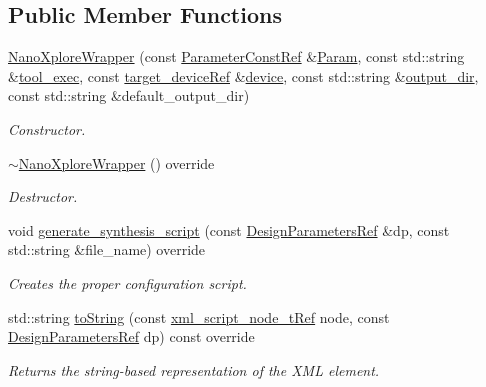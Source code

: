 \subsection*{Public Member Functions}
\begin{DoxyCompactItemize}
\item 
\hyperlink{classNanoXploreWrapper_a0304c7e4f176fa98ad82feca482bd500}{Nano\+Xplore\+Wrapper} (const \hyperlink{Parameter_8hpp_a37841774a6fcb479b597fdf8955eb4ea}{Parameter\+Const\+Ref} \&\hyperlink{classSynthesisTool_a854ef102782ff4d069e1aa6d1a94d64e}{Param}, const std\+::string \&\hyperlink{classSynthesisTool_a78fd58496215c69838de4269204804a5}{tool\+\_\+exec}, const \hyperlink{target__device_8hpp_acedb2b7a617e27e6354a8049fee44eda}{target\+\_\+device\+Ref} \&\hyperlink{classSynthesisTool_a07bf37421c6cff80ba70682ea2b2e3ae}{device}, const std\+::string \&\hyperlink{classSynthesisTool_a285793f6f539ed6f049c375cdb68d607}{output\+\_\+dir}, const std\+::string \&default\+\_\+output\+\_\+dir)
\begin{DoxyCompactList}\small\item\em Constructor. \end{DoxyCompactList}\item 
\hyperlink{classNanoXploreWrapper_a77516222ea5ee579e188457e26886a4e}{$\sim$\+Nano\+Xplore\+Wrapper} () override
\begin{DoxyCompactList}\small\item\em Destructor. \end{DoxyCompactList}\item 
void \hyperlink{classNanoXploreWrapper_ac4cfa67a4c97e96b14aca7dbbe39e79b}{generate\+\_\+synthesis\+\_\+script} (const \hyperlink{DesignParameters_8hpp_ae36bb1c4c9150d0eeecfe1f96f42d157}{Design\+Parameters\+Ref} \&dp, const std\+::string \&file\+\_\+name) override
\begin{DoxyCompactList}\small\item\em Creates the proper configuration script. \end{DoxyCompactList}\item 
std\+::string \hyperlink{classNanoXploreWrapper_ac21600c8f4e069a14f07a91560caf0c1}{to\+String} (const \hyperlink{xml__script__command_8hpp_a1fe3d50ade66bc35e41be9b68bbbcd02}{xml\+\_\+script\+\_\+node\+\_\+t\+Ref} node, const \hyperlink{DesignParameters_8hpp_ae36bb1c4c9150d0eeecfe1f96f42d157}{Design\+Parameters\+Ref} dp) const override
\begin{DoxyCompactList}\small\item\em Returns the string-\/based representation of the X\+ML element. \end{DoxyCompactList}\item 

\end{DoxyCompactItemize}
